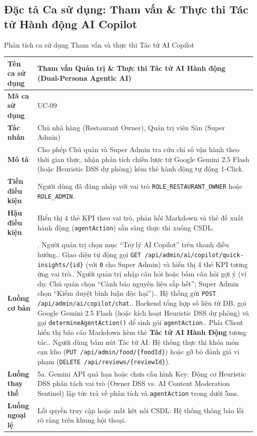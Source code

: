 \documentclass{uetgraduation}
\begin{document}
\clearpage
\subsection{Đặc tả Ca sử dụng: Tham vấn \& Thực thi Tác tử Hành động AI Copilot}
\begin{table}[!htbp]{Phân tích ca sử dụng Tham vấn và thực thi Tác tử AI Copilot}
\centering
\small
\begin{tabularx}{\textwidth}{|l|>{\raggedright\arraybackslash}X|}
\hline
\textbf{Tên ca sử dụng} & \textbf{Tham vấn Quản trị \& Thực thi Tác tử AI Hành động (Dual-Persona Agentic AI)} \\ \hline
\textbf{Mã ca sử dụng} & UC-09 \\ \hline
\textbf{Tác nhân} & Chủ nhà hàng (Restaurant Owner), Quản trị viên Sàn (Super Admin) \\ \hline
\textbf{Mô tả} & Cho phép Chủ quán và Super Admin tra cứu chỉ số vận hành theo thời gian thực, nhận phân tích chiến lược từ Google Gemini 2.5 Flash (hoặc Heuristic DSS dự phòng) kèm thẻ hành động tự động 1-Click. \\ \hline
\textbf{Tiền điều kiện} & Người dùng đã đăng nhập với vai trò \texttt{ROLE\_RESTAURANT\_OWNER} hoặc \texttt{ROLE\_ADMIN}. \\ \hline
\textbf{Hậu điều kiện} & Hiển thị 4 thẻ KPI theo vai trò, phản hồi Markdown và thẻ đề xuất hành động (\texttt{agentAction}) sẵn sàng thực thi xuống CSDL. \\ \hline
\textbf{Luồng cơ bản} & 
1. Người quản trị chọn mục ``Trợ lý AI Copilot'' trên thanh điều hướng.\newline
2. Giao diện tự động gọi \texttt{GET /api/admin/ai/copilot/quick-insights/\{id\}} (với \texttt{0} cho Super Admin) và hiển thị 4 thẻ KPI tương ứng vai trò.\newline
3. Người quản trị nhập câu hỏi hoặc bấm câu hỏi gợi ý (ví dụ: Chủ quán chọn ``Cảnh báo nguyên liệu sắp hết''; Super Admin chọn ``Kiểm duyệt bình luận độc hại'').\newline
4. Hệ thống gửi \texttt{POST /api/admin/ai/copilot/chat}.\newline
5. Backend tổng hợp số liệu từ DB, gọi Google Gemini 2.5 Flash (hoặc kích hoạt Heuristic DSS dự phòng) và gọi \texttt{determineAgentAction()} để sinh gói \texttt{agentAction}.\newline
6. Phía Client hiển thị báo cáo Markdown kèm thẻ \textbf{Tác tử AI Hành Động} tương tác.\newline
7. Người dùng bấm nút Tác tử AI: Hệ thống thực thi khóa món cạn kho (\texttt{PUT /api/admin/food/\{foodId\}}) hoặc gỡ bỏ đánh giá vi phạm (\texttt{DELETE /api/reviews/\{reviewId\}}). \\ \hline
\textbf{Luồng thay thế} & 
5a. Gemini API quá hạn hoặc chưa cấu hình Key: Động cơ Heuristic DSS phân tách vai trò (Owner DSS vs. AI Content Moderation Sentinel) lập tức trả về phân tích và \texttt{agentAction} trong dưới 5ms. \\ \hline
\textbf{Luồng ngoại lệ} & 
Lỗi quyền truy cập hoặc mất kết nối CSDL: Hệ thống thông báo lỗi rõ ràng trên khung hội thoại. \\ \hline
\end{tabularx}
\end{table}
\end{document}
